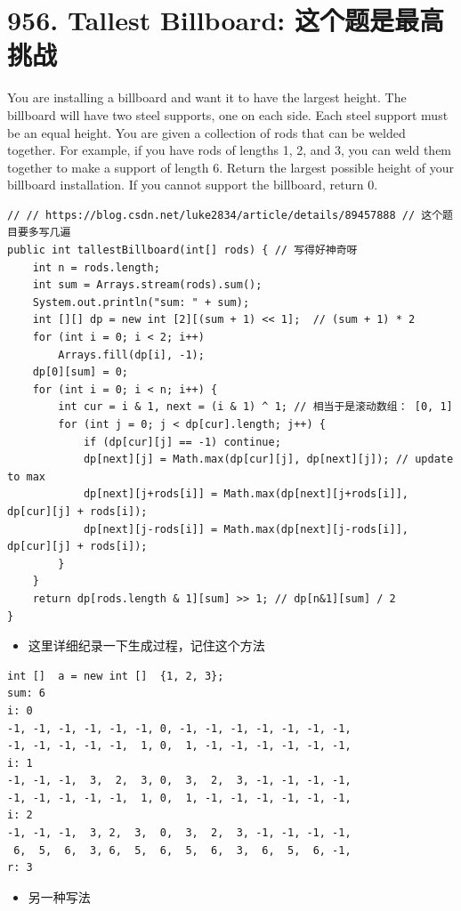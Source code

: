 \documentclass[9pt, b5paaper]{book}
\begin{document}
\section{956. Tallest Billboard: 这个题是最高挑战}
\label{sec-11-9}
You are installing a billboard and want it to have the largest height. The billboard will have two steel supports, one on each side. Each steel support must be an equal height.
You are given a collection of rods that can be welded together. For example, if you have rods of lengths 1, 2, and 3, you can weld them together to make a support of length 6.
Return the largest possible height of your billboard installation. If you cannot support the billboard, return 0.
\begin{verbatim}
// // https://blog.csdn.net/luke2834/article/details/89457888 // 这个题目要多写几遍
public int tallestBillboard(int[] rods) { // 写得好神奇呀
    int n = rods.length;
    int sum = Arrays.stream(rods).sum();
    System.out.println("sum: " + sum);
    int [][] dp = new int [2][(sum + 1) << 1];  // (sum + 1) * 2
    for (int i = 0; i < 2; i++) 
        Arrays.fill(dp[i], -1);
    dp[0][sum] = 0;
    for (int i = 0; i < n; i++) {
        int cur = i & 1, next = (i & 1) ^ 1; // 相当于是滚动数组： [0, 1]
        for (int j = 0; j < dp[cur].length; j++) {
            if (dp[cur][j] == -1) continue;
            dp[next][j] = Math.max(dp[cur][j], dp[next][j]); // update to max
            dp[next][j+rods[i]] = Math.max(dp[next][j+rods[i]], dp[cur][j] + rods[i]);
            dp[next][j-rods[i]] = Math.max(dp[next][j-rods[i]], dp[cur][j] + rods[i]);
        }
    }
    return dp[rods.length & 1][sum] >> 1; // dp[n&1][sum] / 2
}
\end{verbatim}
\begin{itemize}
\item 这里详细纪录一下生成过程，记住这个方法
\end{itemize}
\begin{verbatim}
int []  a = new int []  {1, 2, 3};
sum: 6
i: 0
-1, -1, -1, -1, -1, -1, 0, -1, -1, -1, -1, -1, -1, -1,
-1, -1, -1, -1, -1,  1, 0,  1, -1, -1, -1, -1, -1, -1,
i: 1
-1, -1, -1,  3,  2,  3, 0,  3,  2,  3, -1, -1, -1, -1,
-1, -1, -1, -1, -1,  1, 0,  1, -1, -1, -1, -1, -1, -1,
i: 2
-1, -1, -1,  3, 2,  3,  0,  3,  2,  3, -1, -1, -1, -1,
 6,  5,  6,  3, 6,  5,  6,  5,  6,  3,  6,  5,  6, -1,
r: 3
\end{verbatim}
\begin{itemize}
\item 另一种写法
\end{itemize}
\end{document}
